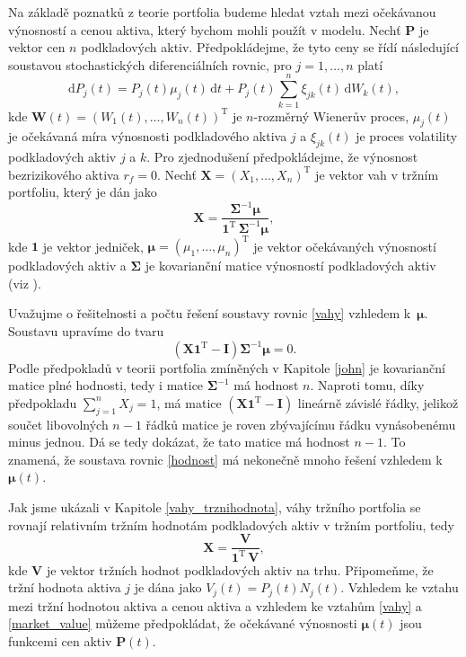 \documentclass[a4paper,12pt]{report}
\theoremstyle{definition} \newtheorem{definice}[veta]{Definice}
\theoremstyle{remark}
\begin{document}
Na základě poznatků z teorie portfolia budeme hledat vztah mezi očekávanou výnosností a cenou aktiva, který bychom mohli použít v modelu.
Nechť $\boldsymbol{P}$ je vektor cen $n$ podkladových aktiv.
Předpokládejme, že tyto ceny se řídí následující soustavou stochastických diferenciálních rovnic, pro $j=1,\dots,n$ platí
\begin{equation} \label{SDE}
\mathrm{d}P_j(t)=P_j(t)\mu_j(t)\,\mathrm{d}t+P_j(t)\sum_{k=1}^{n}\xi_{jk}(t)\,\mathrm{d}W_k(t),
\end{equation}
kde $\boldsymbol{W}(t)=(W_1(t),\dots,W_n(t))^\mathrm{T}$ je $n$-rozměrný Wienerův proces, $\mu_j(t)$ je očekávaná míra výnosnosti podkladového aktiva $j$ a $\xi_{jk}(t)$ je proces volatility podkladových aktiv $j$ a $k$. 
Pro zjednodušení předpokládejme, že výnosnost bezrizikového aktiva $r_f=0$.
Nechť $\boldsymbol{X}=(X_1,\dots,X_n)^\mathrm{T}$ je vektor vah v tržním portfoliu, který je dán jako
\begin{equation} \label{vahy}
\boldsymbol{X}=\frac{\boldsymbol{\Sigma}^{-1}\boldsymbol{\mu}}{\boldsymbol{1}^\mathrm{T}\,\boldsymbol{\Sigma}^{-1}\boldsymbol{\mu}},
\end{equation}
kde $\boldsymbol{1}$ je vektor jedniček, $\boldsymbol{\mu}=(\mu_1,\dots,\mu_n)^\mathrm{T}$ je vektor očekávaných výnosností podkladových aktiv a $\boldsymbol{\Sigma}$ je kovarianční matice výnosností podkladových aktiv (viz \cite{fabozzi}).

Uvažujme o řešitelnosti a počtu řešení soustavy rovnic \eqref{vahy} vzhledem k~$\boldsymbol{\mu}$.
Soustavu upravíme do tvaru
\begin{equation} \label{hodnost}
\left(\boldsymbol{X}\boldsymbol{1}^\mathrm{T}-\mathbf{I}\right)\boldsymbol{\Sigma}^{-1}\boldsymbol{\mu}=0.
\end{equation}
Podle předpokladů v teorii portfolia zmíněných v Kapitole \ref{john} je kovarianční matice plné hodnosti, tedy i matice $\boldsymbol{\Sigma}^{-1}$ má hodnost $n$.
Naproti tomu, díky předpokladu $\sum_{j=1}^nX_j=1$, má matice $\left(\boldsymbol{X}\boldsymbol{1}^\mathrm{T}-\mathbf{I}\right)$ lineárně závislé řádky, jelikož
součet libovolných $n-1$ řádků matice  je roven zbývajícímu řádku vynásobenému minus jednou.
Dá se tedy dokázat, že tato matice má hodnost $n-1$.
To znamená, že soustava rovnic \eqref{hodnost} má nekonečně mnoho řešení vzhledem k $\boldsymbol{\mu}(t)$.

Jak jsme ukázali v Kapitole \ref{vahy_trznihodnota}, váhy tržního portfolia se rovnají relativním tržním hodnotám podkladových aktiv v tržním portfoliu, tedy
\begin{equation} \label{market_value}
\boldsymbol{X}=\frac{\boldsymbol{V}}{\boldsymbol{1}^\mathrm{T}\,\boldsymbol{V}},
\end{equation}
kde $\boldsymbol{V}$ je vektor tržních hodnot podkladových aktiv na trhu.
Připomeňme, že tržní hodnota aktiva $j$ je dána jako $V_j(t)=P_j(t)N_j(t)$.
Vzhledem ke vztahu mezi tržní hodnotou aktiva a cenou aktiva a vzhledem ke vztahům \eqref{vahy} a \eqref{market_value} můžeme předpokládat, že očekávané výnosnosti $\boldsymbol{\mu}(t)$ jsou funkcemi cen aktiv $\boldsymbol{P}(t)$. 
\end{document}
